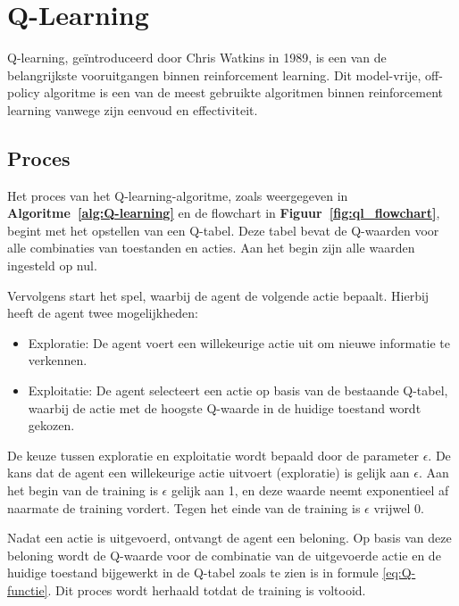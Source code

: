\documentclass[a4paper,12pt]{report}
\begin{document}
\section{Q-Learning}
Q-learning, geïntroduceerd door Chris Watkins in 1989, is een van de
belangrijkste vooruitgangen binnen reinforcement learning. Dit model-vrije,
off-policy algoritme is een van de meest gebruikte algoritmen binnen
reinforcement learning vanwege zijn eenvoud en effectiviteit.
\subsection{Proces}
Het proces van het Q-learning-algoritme, zoals weergegeven in
\textbf{Algoritme~\ref{alg:Q-learning}} en de flowchart in
\textbf{Figuur~\ref{fig:ql_flowchart}}, begint met het opstellen van een
Q-tabel. Deze tabel bevat de Q-waarden voor alle combinaties van toestanden en
acties. Aan het begin zijn alle waarden ingesteld op nul.

Vervolgens start het spel, waarbij de agent de volgende actie bepaalt. Hierbij
heeft de agent twee mogelijkheden:
\begin{itemize}
    \item Exploratie: De agent voert een willekeurige actie uit om nieuwe informatie te
          verkennen.
    \item Exploitatie: De agent selecteert een actie op basis van de bestaande Q-tabel,
          waarbij de actie met de hoogste Q-waarde in de huidige toestand wordt gekozen.
\end{itemize}

De keuze tussen exploratie en exploitatie wordt bepaald door de parameter
$\epsilon$. De kans dat de agent een willekeurige actie uitvoert (exploratie)
is gelijk aan $\epsilon$. Aan het begin van de training is $\epsilon$ gelijk
aan 1, en deze waarde neemt exponentieel af naarmate de training vordert. Tegen
het einde van de training is $\epsilon$ vrijwel 0.

Nadat een actie is uitgevoerd, ontvangt de agent een beloning. Op basis van
deze beloning wordt de Q-waarde voor de combinatie van de uitgevoerde actie en
de huidige toestand bijgewerkt in de Q-tabel zoals te zien is in formule
\eqref{eq:Q-functie}. Dit proces wordt herhaald totdat de training is voltooid.
\end{document}
